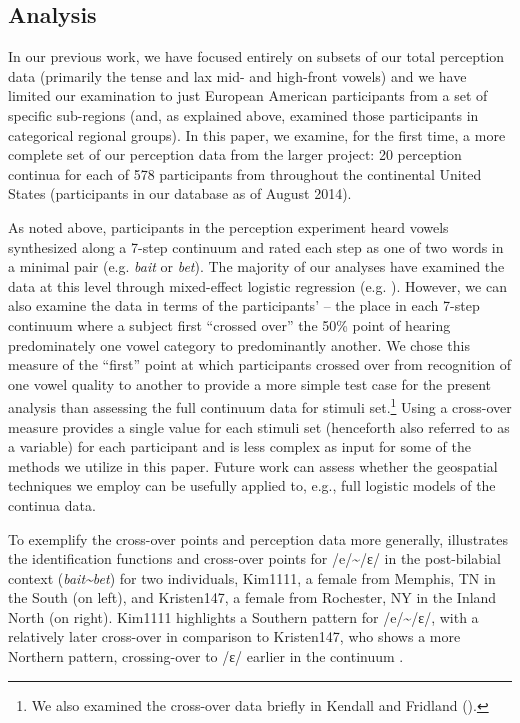 \documentclass[output=paper]{LSP/langsci}
\begin{document}
\subsection{Analysis}
In our previous work, we have focused entirely on subsets of our total perception data (primarily the tense and lax mid- and high-front vowels) and we have limited our examination to just European American participants from a set of specific sub-regions (and, as explained above, examined those participants in categorical regional groups). In this paper, we examine, for the first time, a more complete set of our perception data from the larger project: 20 perception continua for each of 578 participants from throughout the continental United States (participants in our database as of August 2014). 

As noted above, participants in the perception experiment heard vowels synthesized along a 7-step continuum and rated each step as one of two words in a minimal pair (e.g. \textit{bait} or \textit{bet}). The majority of our analyses have examined the data at this level through mixed-effect logistic regression (e.g. \citealt{kendall_variation_2012}). However, we can also examine the data in terms of the participants’  – the place in each 7-step continuum where a subject first “crossed over” the 50\% point of hearing predominately one vowel category to predominantly another. We chose this measure of the “first” point at which participants crossed over from recognition of one vowel quality to another to provide a more simple test case for the present analysis than assessing the full continuum data for stimuli set.\footnote{We also examined the cross-over data briefly in Kendall and Fridland (\citeyear{kendall_mapping_2010,kendall_variation_2012}).} Using a cross-over measure provides a single value for each stimuli set (henceforth also referred to as a variable) for each participant and is less complex as input for some of the methods we utilize in this paper. Future work can assess whether the geospatial techniques we employ can be usefully applied to, e.g., full logistic models of the continua data.

To exemplify the cross-over points and perception data more generally,  illustrates the identification functions and cross-over points for /e/{\textasciitilde}/ɛ/ in the post-bilabial context (\textit{bait{\textasciitilde}bet}) for two individuals, Kim1111, a female from Memphis, TN in the South (on left), and Kristen147, a female from Rochester, NY in the Inland North (on right). Kim1111 highlights a Southern pattern for /e/{\textasciitilde}/ɛ/, with a relatively later cross-over in comparison to Kristen147, who shows a more Northern pattern, crossing-over to /ɛ/ earlier in the continuum \citep{kendall_variation_2012}.
\end{document}
